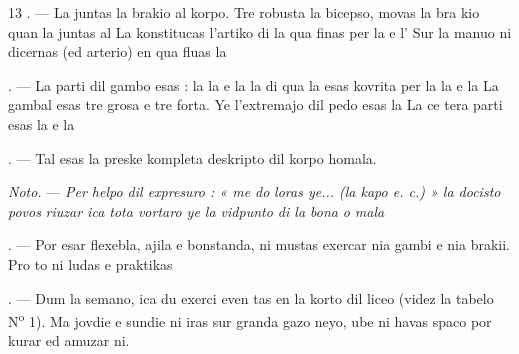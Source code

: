 \begin{VUpage}[15]{13}
. --- La  juntas la brakio al korpo.\nl
Tre robusta  la bicepso, movas la bra\cc
kio quan la  juntas al  La\nl
{} konstitucas l'artiko di la  qua\nl
finas per la  e l' Sur la manuo ni\nl
dicernas  (ed arterio) en qua fluas la\nl
{}

. --- La parti dil gambo esas : la \nl
la  e la  la  di qua la \nl
esas kovrita per la  la  e la \nl
La gambal  esas tre grosa e tre forta. Ye\nl
l'extremajo dil pedo esas la  La ce\cc
tera parti esas la  e la 

. --- Tal esas la preske kompleta deskripto\nl
dil korpo homala.

\VUblancAlinea
\textit{Noto.} --- \textit{Per helpo dil expresuro : « me do}\cc
\textit{loras ye... (la kapo e. c.) » la docisto povos}\nl
\textit{riuzar ica tota vortaro ye la vidpunto di la bona}\nl
\textit{o mala} 

\VUsaut{5.0mm}
\VUsaut{2.4mm}
\VUsaut{3.0mm}

. --- Por esar flexebla, ajila e bonstanda,\nl
ni mustas exercar nia gambi e nia brakii. Pro\nl
to ni ludas e praktikas 

. --- Dum la semano, ica du exerci even\cc
tas en la korto dil liceo (videz la tabelo N\textsuperscript{o} 1).\nl
Ma jovdie e sundie ni iras sur granda gazo\cc
neyo, ube ni havas spaco por kurar ed amuzar\nl
ni.
\end{VUpage}

